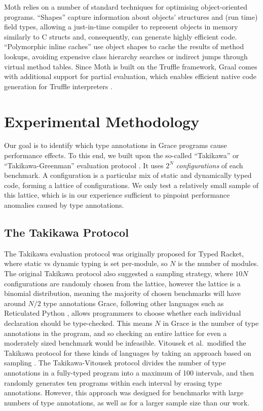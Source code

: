 \documentclass[sigplan,screen]{acmart}
\newcommand{\RR}[1]{{\color{red}RR: #1}}
\begin{document}
Moth relies on a number of standard techniques for optimising
object-oriented programs.
``Shapes'' \citep{woss2014object} capture information about objects'
structures and (run time) 
field types, allowing a just-in-time compiler to
represent objects in memory similarly to C structs and, consequently,
can generate highly efficient code.
``Polymorphic inline caches''
\citep{Hoelzle:91:PIC} use object shapes to cache the results of
method lookups, avoiding expensive class hierarchy searches or
indirect jumps through virtual method tables. 
Since Moth is built on the Truffle framework,
Graal comes with  additional support for partial evaluation,
which enables efficient native code generation for
Truffle interpreters \citep{Wurthinger:2017:PPE}.

\section{Experimental Methodology}
\label{s-meth}

Our goal is to identify which type annotations in Grace programs
cause performance effects.
To this end, we built upon the so-called ``Takikawa'' or ``Takikawa-Greenman'' evaluation protocol \cite{Takikawa2016,Greenman2019jfp}.
It uses $2^N$ \emph{configurations} of each benchmark.
A configuration is a particular mix of static and dynamically typed code, forming a lattice of configurations.
We only test a relatively small sample of this lattice,
which is in our experience sufficient to pinpoint performance anomalies caused
by type annotations.

\subsection{The Takikawa Protocol}
The Takikawa evaluation protocol was originally proposed for Typed
Racket, where static vs dynamic typing is set per-module, so $N$ is
the number of modules. The original Takikawa protocol also suggested a sampling strategy, where $10N$ configurations are randomly chosen from the lattice, however the lattice is a binomial distribution, meaning the majority of chosen benchmarks will have around $N/2$ type annotations
Grace, following other languages such as
Reticulated Python \cite{reticPython2014,monotonic2015,Vitousek2017},
allows programmers to choose whether each individual declaration should be type-checked. This means $N$ in Grace is the number of type annotations in the program, and so
checking an entire lattice for even a moderately sized benchmark would be infeasible.  Vitousek et al.\ modified the Takikawa protocol for
these kinds of languages by taking an approach based on sampling
\cite{vitousek-transient-arXive-2019}.  The Takikawa-Vitousek protocol
divides the number of type annotations in a fully-typed program into
a maximum of 100 intervals, and then randomly generates ten programs within
each interval by erasing type annotations.
However, this approach was designed for benchmarks with large numbers of type annotations, as well as for a larger sample size than our work.
\end{document}
